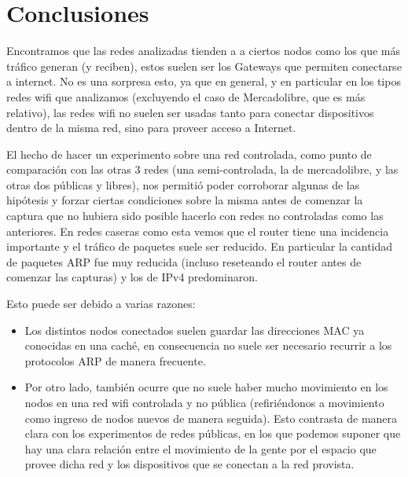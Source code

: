 \documentclass{article}
\theoremstyle{definition}
\theoremstyle{remark}
\begin{document}
\section{Conclusiones}

Encontramos que las redes analizadas tienden a a ciertos nodos como los que más tráfico generan (y reciben), estos suelen ser los Gateways que permiten conectarse a internet. No es una sorpresa esto, ya que en general, y en particular en los tipos redes wifi que analizamos (excluyendo el caso de Mercadolibre, que es más relativo), las redes wifi no suelen ser usadas tanto para conectar dispositivos dentro de la misma red, sino para proveer acceso a Internet.


El hecho de hacer un experimento sobre una red controlada, como punto de comparación con las otras 3 redes (una semi-controlada, la de mercadolibre, y las otras dos públicas y libres), nos permitió poder corroborar algunas de las hipótesis y forzar ciertas condiciones sobre la misma antes de comenzar la captura que no hubiera sido posible hacerlo con redes no controladas como las anteriores. En redes caseras como esta vemos que el router tiene una incidencia importante y el tráfico de paquetes suele ser reducido. En particular la cantidad de paquetes ARP fue muy reducida (incluso reseteando el router antes de comenzar las capturas) y los de IPv4 predominaron.

Esto puede ser debido a varias razones:
\begin{itemize}
 
\item Los distintos nodos conectados suelen guardar las direcciones MAC ya conocidas en una caché, en consecuencia no suele ser necesario recurrir a los protocolos ARP de manera frecuente.

\item Por otro lado, también ocurre que no suele haber mucho movimiento en los nodos en una red wifi controlada y no pública (refiriéndonos a movimiento como ingreso de nodos nuevos de manera seguida). Esto contrasta de manera clara con los experimentos de redes públicas, en los que podemos suponer que hay una clara relación entre el movimiento de la gente por el espacio que provee dicha red y los dispositivos que se conectan a la red provista.

\end{itemize}


    
\end{document}
